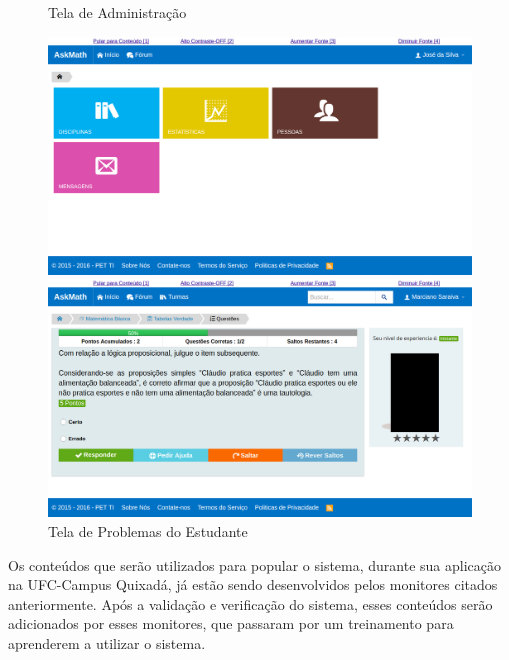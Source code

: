 \begin{figure}[H]
  \begin{minipage}[b]{0.49\textwidth}
    \caption{Tela de Administra\c{c}\~ao}
    \includegraphics[width=\textwidth]{figuras/askmath/3}
  \end{minipage}
  \hfill
  \begin{minipage}[b]{0.49\textwidth}
	\caption{Tela de Problemas do Estudante}
    \includegraphics[width=\textwidth]{figuras/askmath/4}
  \end{minipage}
\end{figure}

Os conteúdos que serão utilizados para popular o sistema, durante sua aplicação na UFC-Campus Quixadá, já estão sendo desenvolvidos pelos monitores citados anteriormente. Após a validação e verificação do sistema, esses conteúdos serão adicionados por esses monitores, que passaram por um treinamento para aprenderem a utilizar o sistema.







